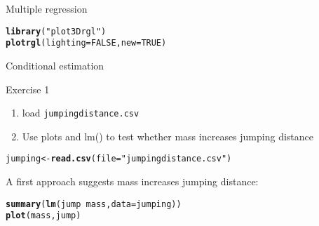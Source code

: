 \documentclass[10pt]{beamer}\usepackage[]{graphicx}\usepackage[]{color}
\makeatletter
\newcommand{\hlnum}[1]{\textcolor[rgb]{0.686,0.059,0.569}{#1}}%
\newcommand{\hlstr}[1]{\textcolor[rgb]{0.192,0.494,0.8}{#1}}%
\newcommand{\hlopt}[1]{\textcolor[rgb]{0,0,0}{#1}}%
\newcommand{\hlstd}[1]{\textcolor[rgb]{0.345,0.345,0.345}{#1}}%
\newcommand{\hlkwb}[1]{\textcolor[rgb]{0.69,0.353,0.396}{#1}}%
\newcommand{\hlkwc}[1]{\textcolor[rgb]{0.333,0.667,0.333}{#1}}%
\newcommand{\hlkwd}[1]{\textcolor[rgb]{0.737,0.353,0.396}{\textbf{#1}}}%
\newenvironment{kframe}{%
 \def\at@end@of@kframe{}%
 \ifinner\ifhmode%
  \def\at@end@of@kframe{\end{minipage}}%
  \begin{minipage}{\columnwidth}%
 \fi\fi%
 \def\FrameCommand##1{\hskip\@totalleftmargin \hskip-\fboxsep
 \colorbox{shadecolor}{##1}\hskip-\fboxsep
     \hskip-\linewidth \hskip-\@totalleftmargin \hskip\columnwidth}%
 \MakeFramed {\advance\hsize-\width
   \@totalleftmargin\z@ \linewidth\hsize
   \@setminipage}}%
 {\par\unskip\endMakeFramed%
 \at@end@of@kframe}
\newenvironment{knitrout}{}{} %
\makeatother
\begin{document}
\begin{frame}[fragile]{Multiple regression}

\begin{knitrout}\small
{}\color{fgcolor}\begin{kframe}
\begin{alltt}
    \hlkwd{library}\hlstd{(}\hlstr{"plot3Drgl"}\hlstd{)}
\hlkwd{plotrgl}\hlstd{(}\hlkwc{lighting} \hlstd{=} \hlnum{FALSE}\hlstd{,} \hlkwc{new}\hlstd{=}\hlnum{TRUE}\hlstd{)}
\end{alltt}
\end{kframe}
\end{knitrout}

\end{frame}

\begin{frame}[fragile]{Conditional estimation}

\begin{exampleblock}{Exercise 1}
  \begin{enumerate}
    \item load \texttt{jumpingdistance.csv}
    \item Use plots and lm() to test whether mass increases jumping distance
  \end{enumerate}
\end{exampleblock}



\begin{knitrout}\small
{}\color{fgcolor}\begin{kframe}
\begin{alltt}
  \hlstd{jumping} \hlkwb{<-} \hlkwd{read.csv}\hlstd{(}\hlkwc{file} \hlstd{=} \hlstr{"jumpingdistance.csv"}\hlstd{)}
\end{alltt}
\end{kframe}
\end{knitrout}

A first approach suggests mass increases jumping distance:
\begin{knitrout}\small
{}\color{fgcolor}\begin{kframe}
\begin{alltt}
    \hlkwd{summary}\hlstd{(}\hlkwd{lm}\hlstd{(jump} \hlopt{~} \hlstd{mass,} \hlkwc{data}\hlstd{=jumping))}
    \hlkwd{plot}\hlstd{(mass, jump)}
\end{alltt}
\end{kframe}
\end{knitrout}
  

\end{frame}
\end{document}
